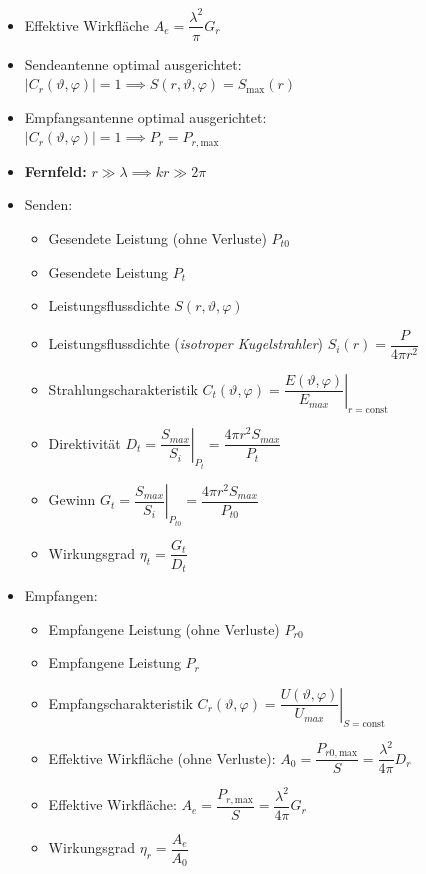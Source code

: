 \begin{itemize}
    \itemsep0pt
    \item Effektive Wirkfläche \(A_e = \dfrac{\lambda^2}{\pi} G_r\)
    \item Sendeantenne optimal ausgerichtet:\\
        \(\left|C_r(\vartheta, \varphi)\right| = 1 \implies S(r,\vartheta,\varphi) = S_{\mathrm{max}}(r)\)
    \item Empfangsantenne optimal ausgerichtet:\\
        \(\left|C_r(\vartheta, \varphi)\right| = 1 \implies P_r = P_{r, \mathrm{max}}\)
    \item \textbf{Fernfeld:} \(r \gg \lambda \implies kr \gg 2\pi\)
    \item Senden:
        \begin{itemize}
            \itemsep0pt
            \item Gesendete Leistung (ohne Verluste) \(P_{t0}\)
            \item Gesendete Leistung \(P_t\)
            \item Leistungsflussdichte \(S(r, \vartheta, \varphi)\)
            \item Leistungsflussdichte (\textit{isotroper Kugelstrahler}) \(S_i(r) = \dfrac{P}{4\pi r^2}\)
            \item Strahlungscharakteristik \(C_t(\vartheta, \varphi) = \left.\dfrac{E(\vartheta, \varphi)}{E_{max}}\right|_{r = \mathrm{const}}\)
            \item Direktivität \(\left.D_t = \dfrac{S_{max}}{S_i}\right|_{P_t} = \dfrac{4\pi r^2 S_{max}}{P_{t}}\)
            \item Gewinn \(\left.G_t = \dfrac{S_{max}}{S_i}\right|_{P_{t0}} = \dfrac{4\pi r^2 S_{max}}{P_{t0}}\)
            \item Wirkungsgrad \(\eta_t = \dfrac{G_t}{D_t}\)
        \end{itemize}
    \item Empfangen:
        \begin{itemize}
            \itemsep0pt
            \item Empfangene Leistung (ohne Verluste) \(P_{r0}\)
            \item Empfangene Leistung \(P_r\)
            \item Empfangscharakteristik \(C_r(\vartheta, \varphi) = \left.\dfrac{U(\vartheta, \varphi)}{U_{max}}\right|_{S = \mathrm{const}}\)
            \item Effektive  Wirkfläche (ohne Verluste): \(A_0 = \dfrac{P_{r0,\mathrm{max}}}{S} = \dfrac{\lambda^2}{4\pi}D_r\)
            \item Effektive  Wirkfläche: \(A_e = \dfrac{P_{r,\mathrm{max}}}{S} = \dfrac{\lambda^2}{4\pi}G_r\)
            \item Wirkungsgrad \(\eta_r = \dfrac{A_e}{A_0}\)
        \end{itemize}

\end{itemize}
